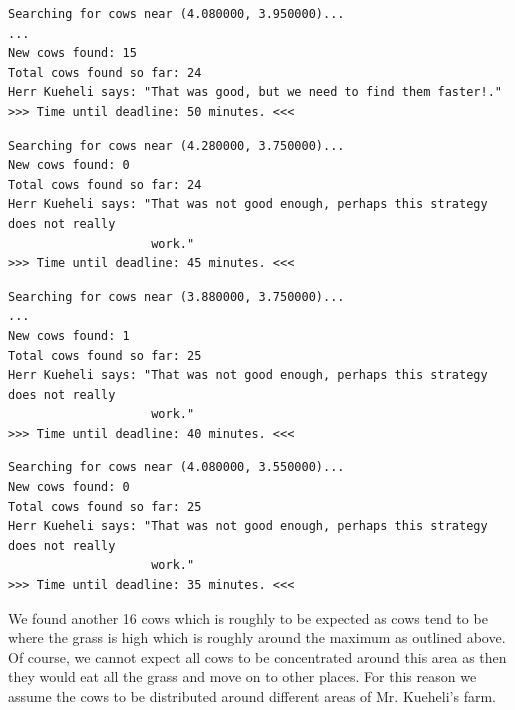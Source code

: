 \documentclass{article}
\begin{document}
    \begin{lstlisting}[basicstyle=\tiny, frame=single,
    caption={Terminal output for $check\_cows$ with one of the suggested x-
    and y-coordinates from in Listing~\ref{lst:CowsOptGrassCoords}.},
    label={lst:CowsOptTopGrassCoords}]
Searching for cows near (4.080000, 3.950000)...
...
New cows found: 15
Total cows found so far: 24
Herr Kueheli says: "That was good, but we need to find them faster!."
>>> Time until deadline: 50 minutes. <<<
    \end{lstlisting}
    \begin{lstlisting}[basicstyle=\tiny, frame=single,
    caption={Terminal output for $check\_cows$ with one of the suggested x-
    and y-coordinates from in Listing~\ref{lst:CowsOptGrassCoords}.},
    label={lst:CowsOptRightGrassCoords}]
Searching for cows near (4.280000, 3.750000)...
New cows found: 0
Total cows found so far: 24
Herr Kueheli says: "That was not good enough, perhaps this strategy does not really
                    work."
>>> Time until deadline: 45 minutes. <<<
    \end{lstlisting}
    \begin{lstlisting}[basicstyle=\tiny, frame=single,
    caption={Terminal output for $check\_cows$ with one of the suggested x-
    and y-coordinates from in Listing~\ref{lst:CowsOptGrassCoords}.},
    label={lst:CowsOptLeftGrassCoords}]
Searching for cows near (3.880000, 3.750000)...
...
New cows found: 1
Total cows found so far: 25
Herr Kueheli says: "That was not good enough, perhaps this strategy does not really
                    work."
>>> Time until deadline: 40 minutes. <<<
    \end{lstlisting}
    \begin{lstlisting}[basicstyle=\tiny, frame=single,
    caption={Terminal output for $check\_cows$ with one of the suggested x-
    and y-coordinates from in Listing~\ref{lst:CowsOptGrassCoords}.},
    label={lst:CowsOptBottomGrassCoords}]
Searching for cows near (4.080000, 3.550000)...
New cows found: 0
Total cows found so far: 25
Herr Kueheli says: "That was not good enough, perhaps this strategy does not really
                    work."
>>> Time until deadline: 35 minutes. <<<
    \end{lstlisting}

    We found another 16 cows which is roughly to be expected as cows tend to
    be where the grass is high which is roughly around the maximum as
    outlined above.
    Of course, we cannot expect all cows to be concentrated around this
    area as then they would eat all the grass and move on to other places.
    For this reason we assume the cows to be distributed around different
    areas of Mr. Kueheli's farm.
\end{document}
